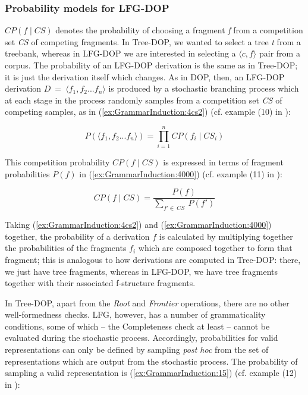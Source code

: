 \documentclass[output=paper,hidelinks]{langscibook}
\begin{document}
\subsubsection{Probability models for LFG-DOP}
$CP(f \mid CS)$ denotes the probability of choosing a fragment {\em f} from a competition set {\em CS} of competing fragments. In Tree-DOP, we wanted to select a tree {\em t} from a treebank, whereas in LFG-DOP we are
interested in selecting a $\langle c,f\rangle$ pair from a corpus. The probability of an LFG-DOP derivation is the same  as in Tree-DOP; it is just the derivation itself which
changes. As in DOP, then, an LFG-DOP derivation $D~=~\langle f_1,f_2 ... f_n
\rangle$ is produced by a stochastic branching process which at each stage in the process randomly samples from a competition set {\em CS} of competing samples, as in (\ref{ex:GrammarInduction:4cs2}) (cf. example (10) in \cite[148]{bod-kaplan-1998-probabilistic-corpus}):

\begin{equation}
\label{ex:GrammarInduction:4cs2}
P(\langle f_1,f_2 ... f_n \rangle ) = \prod_{i=1}^n CP(f_i \mid CS_i)
\end{equation}

This competition probability $CP(f \mid CS)$ is expressed in terms of fragment probabilities $P(f)$ in (\ref{ex:GrammarInduction:4000}) (cf. example (11) in \citealt[148]{bod-kaplan-1998-probabilistic-corpus}):

\begin{equation}
\label{ex:GrammarInduction:4000}
CP(f \mid CS) = \frac{P(f)}{\sum\limits_{f'\in~CS}~P(f')}
\end{equation}

Taking (\ref{ex:GrammarInduction:4cs2}) and (\ref{ex:GrammarInduction:4000}) together, the probability of a derivation $f$ is calculated by multiplying together the probabilities of the fragments $f_i$ which are composed together to form that fragment; this is analogous to how derivations are computed in Tree-DOP: there, we just have tree fragments, whereas in LFG-DOP, we have tree fragments together with their associated f-structure fragments.

In Tree-DOP, apart from  the {\em Root} and {\em
Frontier} operations, there are no other well-formedness checks. LFG, however, has a number of grammaticality conditions, some of which -- the Completeness check at least -- cannot be evaluated during the stochastic process. Accordingly, probabilities for valid representations can only be defined by sampling {\em post hoc} from the set of representations which are output from the stochastic process. The probability of sampling a valid representation is
(\ref{ex:GrammarInduction:15}) (cf. example (12) in \citealt[148]{bod-kaplan-1998-probabilistic-corpus}):  
\end{document}
